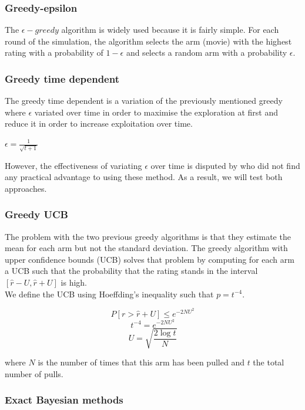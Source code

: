 \documentclass[letterpaper]{article}
\begin{document}
\subsubsection{Greedy-epsilon}

The $\epsilon-greedy$ algorithm is widely used because it is fairly simple. For each round of the simulation, the algorithm selects the arm (movie) with the highest rating with a probability of $1-\epsilon$ and selects a random arm with a probability $\epsilon$.

\subsubsection{Greedy time dependent}

The greedy time dependent is a variation of the previously mentioned greedy where $\epsilon$ variated over time in order to maximise the exploration at first and reduce it in order to increase exploitation over time.

\begin{center}
	$\epsilon = \frac{1}{\sqrt{t+1}}$
\end{center}

However, the effectiveness of variating $\epsilon$ over time is disputed by \cite{vermorel2005multi} who did not find any practical advantage to using these method. As a result, we will test both approaches.

\subsubsection{Greedy UCB}

The problem with the two previous greedy algorithms is that they estimate the mean for each arm but not the standard deviation. The greedy algorithm with upper confidence bounds (UCB) solves that problem by computing for each arm a UCB such that the probability that the rating stands in the interval $[\hat{r}-U, \hat{r}+U]$ is high. \\
We define the UCB using Hoeffding's inequality such that $p = t^{-4}$.

$$ P[r > \hat{r} + U] \leq e^{-2NU^{2}} $$
$$ t^{-4} = e^{-2NU^{2}} $$
$$ U = \sqrt{\frac{2\log{t}}{N}} $$

where $N$ is the number of times that this arm has been pulled and $t$ the total number of pulls.

\subsubsection{Exact Bayesian methods}
\end{document}
